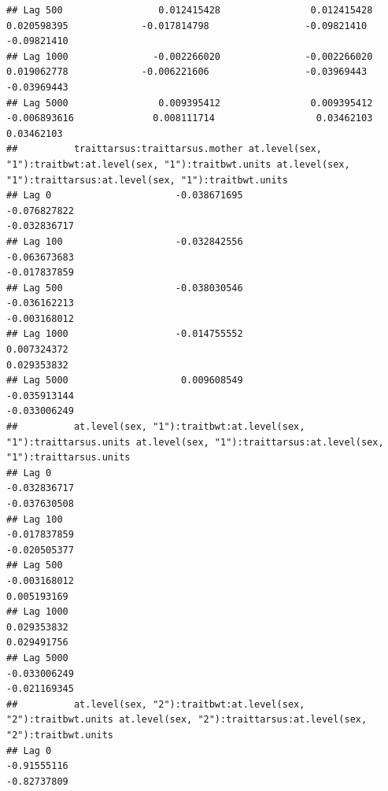 \documentclass[
  12pt,
]{book}
\begin{document}
\begin{verbatim}
## Lag 500                 0.012415428                0.012415428                   0.020598395             -0.017814798                 -0.09821410                 -0.09821410
## Lag 1000               -0.002266020               -0.002266020                   0.019062778             -0.006221606                 -0.03969443                 -0.03969443
## Lag 5000                0.009395412                0.009395412                  -0.006893616              0.008111714                  0.03462103                  0.03462103
##          traittarsus:traittarsus.mother at.level(sex, "1"):traitbwt:at.level(sex, "1"):traitbwt.units at.level(sex, "1"):traittarsus:at.level(sex, "1"):traitbwt.units
## Lag 0                      -0.038671695                                                  -0.076827822                                                     -0.032836717
## Lag 100                    -0.032842556                                                  -0.063673683                                                     -0.017837859
## Lag 500                    -0.038030546                                                  -0.036162213                                                     -0.003168012
## Lag 1000                   -0.014755552                                                   0.007324372                                                      0.029353832
## Lag 5000                    0.009608549                                                  -0.035913144                                                     -0.033006249
##          at.level(sex, "1"):traitbwt:at.level(sex, "1"):traittarsus.units at.level(sex, "1"):traittarsus:at.level(sex, "1"):traittarsus.units
## Lag 0                                                        -0.032836717                                                        -0.037630508
## Lag 100                                                      -0.017837859                                                        -0.020505377
## Lag 500                                                      -0.003168012                                                         0.005193169
## Lag 1000                                                      0.029353832                                                         0.029491756
## Lag 5000                                                     -0.033006249                                                        -0.021169345
##          at.level(sex, "2"):traitbwt:at.level(sex, "2"):traitbwt.units at.level(sex, "2"):traittarsus:at.level(sex, "2"):traitbwt.units
## Lag 0                                                      -0.91555116                                                      -0.82737809

\end{verbatim}
\end{document}
